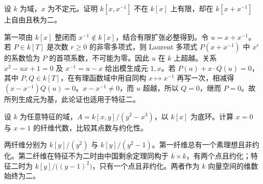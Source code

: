 \begin{exercise}\label{b3:ex:05-nonnormalization-projection}
	设 \(k\) 为域，\(x\) 为不定元。证明 \(k[x,x^{-1}]\) 不在 \(k[x]\) 上有限，却在 \(k[x+x^{-1}]\) 上自由且秩为二。
\end{exercise}
\begin{solution}
	第一项由 \(k[x]\) 整闭而 \(x^{-1}\notin k[x]\)，结合有限扩张必整得到。令 \(u=x+x^{-1}\)。若 \(P\in k[T]\) 是次数 \(r\ge0\) 的非零多项式，则 Laurent 多项式 \(P(x+x^{-1})\) 中 \(x^r\) 的系数恰为 \(P\) 的首项系数，不可能为零。因此 \(u\) 在 \(k\) 上超越。关系 \(x^2-ux+1=0\) 及 \(x^{-1}=u-x\) 给出模生成元 \(1,x\)。若 \(P(u)+x\cdot Q(u)=0\)，其中 \(P,Q\in k[T]\)，在有理函数域中用自同构 \(x\mapsto x^{-1}\) 再写一次，相减得 \((x-x^{-1})Q(u)=0\)。\(x-x^{-1}\ne0\)，而 \(u\) 超越，所以 \(Q=0\)，继而 \(P=0\)。故所列生成元为基，此论证也适用于特征二。
\end{solution}

\begin{exercise}\label{b3:ex:05-finite-nonreduced-fibres}
	设 \(k\) 为任意特征的域，\(A=k[x,y]/(y^2-x^3)\)，以 \(k[x]\) 为底环。计算 \(x=0\) 与 \(x=1\) 的纤维代数，比较其点数与约化性。
\end{exercise}
\begin{solution}
	两纤维分别为 \(k[y]/(y^2)\) 与 \(k[y]/(y^2-1)\)。第一纤维总有一个素理想且非约化。第二纤维在特征不为二时由中国剩余定理同构于 \(k\times k\)，有两个点且约化；特征二时为 \(k[y]/\bigl((y-1)^2\bigr)\)，只有一个点且非约化。两者作为 \(k\) 向量空间的维数始终为二。
\end{solution}
